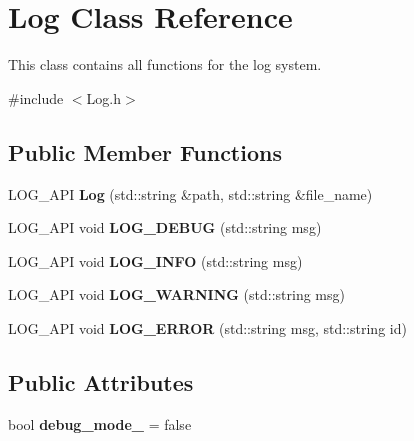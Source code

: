\hypertarget{class_log}{\section{Log Class Reference}
\label{class_log}
}


This class contains all functions for the log system.  




{\ttfamily \#include $<$Log.\-h$>$}

\subsection*{Public Member Functions}
\begin{DoxyCompactItemize}
\item 
\hypertarget{class_log_aef48ac0fa78a4c1b43bb281144c907a6}{L\-O\-G\-\_\-\-A\-P\-I {\bfseries Log} (std\-::string \&path, std\-::string \&file\-\_\-name)}\label{class_log_aef48ac0fa78a4c1b43bb281144c907a6}

\item 
\hypertarget{class_log_aa450b7435e7049d85afbae45b9642274}{L\-O\-G\-\_\-\-A\-P\-I void {\bfseries L\-O\-G\-\_\-\-D\-E\-B\-U\-G} (std\-::string msg)}\label{class_log_aa450b7435e7049d85afbae45b9642274}

\item 
\hypertarget{class_log_abfab2433c1eb46a78e27446506ad2eb5}{L\-O\-G\-\_\-\-A\-P\-I void {\bfseries L\-O\-G\-\_\-\-I\-N\-F\-O} (std\-::string msg)}\label{class_log_abfab2433c1eb46a78e27446506ad2eb5}

\item 
\hypertarget{class_log_a4010e56d8e523c0a5f2b92e92676192a}{L\-O\-G\-\_\-\-A\-P\-I void {\bfseries L\-O\-G\-\_\-\-W\-A\-R\-N\-I\-N\-G} (std\-::string msg)}\label{class_log_a4010e56d8e523c0a5f2b92e92676192a}

\item 
\hypertarget{class_log_ac2700eb2c8f3e0169dab13c080527468}{L\-O\-G\-\_\-\-A\-P\-I void {\bfseries L\-O\-G\-\_\-\-E\-R\-R\-O\-R} (std\-::string msg, std\-::string id)}\label{class_log_ac2700eb2c8f3e0169dab13c080527468}

\end{DoxyCompactItemize}
\subsection*{Public Attributes}
\begin{DoxyCompactItemize}
\item 
\hypertarget{class_log_a12ba1925c1d6b0d363cafbca538da3e6}{bool {\bfseries debug\-\_\-mode\-\_\-} = false}\label{class_log_a12ba1925c1d6b0d363cafbca538da3e6}

\end{DoxyCompactItemize}


